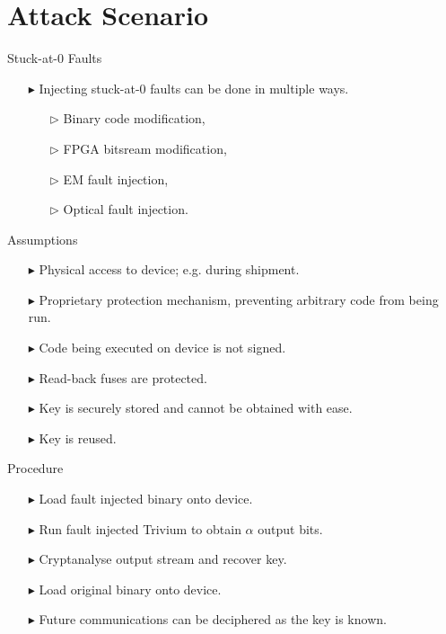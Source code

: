 \documentclass[10pt, compress]{beamer}
\begin{document}
\section{Attack Scenario}

\begin{frame}{Stuck-at-0 Faults}
\begin{itemize}
\item[$\blacktriangleright$] Injecting stuck-at-0 faults can be done in multiple ways.
\begin{itemize}
\item[$\triangleright$] Binary code modification,
\item[$\triangleright$] FPGA bitsream modification,
\item[$\triangleright$] EM fault injection, 
\item[$\triangleright$] Optical fault injection. 
\end{itemize}
\end{itemize}
\end{frame}

\begin{frame}{Assumptions}
\begin{itemize}[itemsep=0.5cm]
\item[$\blacktriangleright$] Physical access to device; e.g. during shipment.
\item[$\blacktriangleright$] Proprietary protection mechanism, preventing arbitrary code from being run.
\item[$\blacktriangleright$] Code being executed on device is not signed.
\item[$\blacktriangleright$] Read-back fuses are protected.
\item[$\blacktriangleright$] Key is securely stored and cannot be obtained with ease.
\item[$\blacktriangleright$] Key is reused.
\end{itemize}
\end{frame}

\begin{frame}{Procedure}
\begin{itemize}[itemsep=0.5cm]
\item[$\blacktriangleright$] Load fault injected binary onto device.
\item[$\blacktriangleright$] Run fault injected Trivium to obtain $\alpha$ output bits.
\item[$\blacktriangleright$] Cryptanalyse output stream and recover key.
\item[$\blacktriangleright$] Load original binary onto device.
\item[$\blacktriangleright$] Future communications can be deciphered as the key is known.
\end{itemize}
\end{frame}
\end{document}
